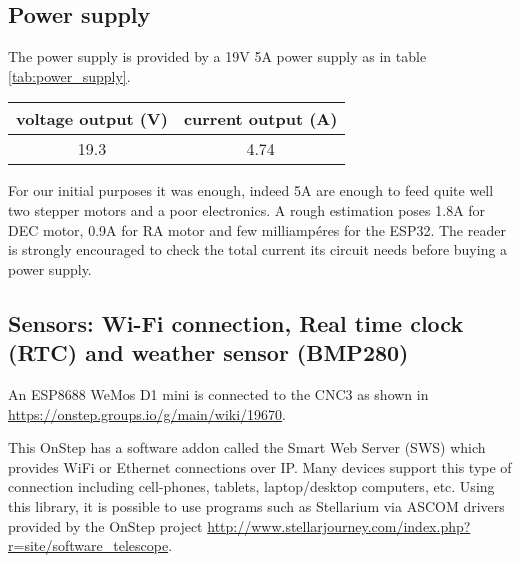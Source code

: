 \subsection{Power supply}
The power supply is provided by a 19V 5A power supply as in table \ref{tab:power_supply}.

\begin{minipage}
    {.4\textwidth}
    \begin{tabular}{cc}
         voltage output (V) & current output (A) \\
         \hline
        19.3 & 4.74 \\
    \end{tabular}
    \label{tab:power_supply}
\end{minipage}

For our initial purposes it was enough, indeed 5A are enough to feed quite well two stepper motors and a poor electronics.
A rough estimation poses 1.8A for DEC motor, 0.9A for RA motor and few milliampéres for the ESP32. 
The reader is strongly encouraged to check the total current its circuit needs before buying a power supply.

\subsection{Sensors: Wi-Fi connection, Real time clock (RTC) and weather sensor (BMP280)}
An ESP8688 WeMos D1 mini is connected to the CNC3 as shown in \url{https://onstep.groups.io/g/main/wiki/19670}.

This OnStep has a software addon called the Smart Web Server (SWS) which provides WiFi or Ethernet connections over IP.
Many devices support this type of connection including cell-phones, tablets, laptop/desktop computers, etc.
Using this library, it is possible to use programs such as Stellarium via ASCOM drivers provided by the OnStep project \url{http://www.stellarjourney.com/index.php?r=site/software_telescope}.